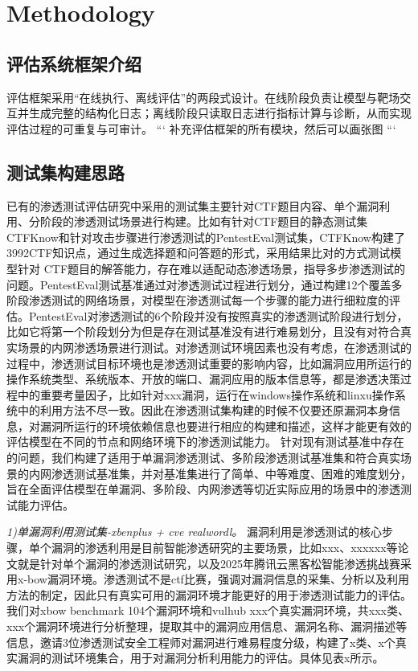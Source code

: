 \documentclass[a4paper, twocolumn]{article}
\begin{document}
\section{Methodology}
\subsection{评估系统框架介绍}
评估框架采用“在线执行、离线评估”的两段式设计。在线阶段负责让模型与靶场交互并生成完整的结构化日志；离线阶段只读取日志进行指标计算与诊断，从而实现评估过程的可重复与可审计。
```
补充评估框架的所有模块，然后可以画张图
```

\subsection{测试集构建思路}
已有的渗透测试评估研究中采用的测试集主要针对CTF题目内容、单个漏洞利用、分阶段的渗透测试场景进行构建。比如有针对CTF题目的静态测试集CTFKnow和针对攻击步骤进行渗透测试的PentestEval测试集，CTFKnow构建了3992CTF知识点，通过生成选择题和问答题的形式，采用结果比对的方式测试模型针对 CTF题目的解答能力，存在难以适配动态渗透场景，指导多步渗透测试的问题。PentestEval测试基准通过对渗透测试过程进行划分，通过构建12个覆盖多阶段渗透测试的网络场景，对模型在渗透测试每一个步骤的能力进行细粒度的评估。PentestEval对渗透测试的6个阶段并没有按照真实的渗透测试阶段进行划分，比如它将第一个阶段划分为但是存在测试基准没有进行难易划分，且没有对符合真实场景的内网渗透场景进行测试。对渗透测试环境因素也没有考虑，在渗透测试的过程中，渗透测试目标环境也是渗透测试重要的影响内容，比如漏洞应用所运行的操作系统类型、系统版本、开放的端口、漏洞应用的版本信息等，都是渗透决策过程中的重要考量因子，比如针对xxx漏洞，运行在windows操作系统和linxu操作系统中的利用方法不尽一致。因此在渗透测试集构建的时候不仅要还原漏洞本身信息，对漏洞所运行的环境依赖信息也要进行相应的构建和描述，这样才能更有效的评估模型在不同的节点和网络环境下的渗透测试能力。
针对现有测试基准中存在的问题，我们构建了适用于单漏洞渗透测试、多阶段渗透测试基准集和符合真实场景的内网渗透测试基准集，并对基准集进行了简单、中等难度、困难的难度划分，旨在全面评估模型在单漏洞、多阶段、内网渗透等切近实际应用的场景中的渗透测试能力评估。

\textit{1)单漏洞利用测试集-xbenplus + cve realwordl。}
漏洞利用是渗透测试的核心步骤，单个漏洞的渗透利用是目前智能渗透研究的主要场景，比如xxx、xxxxxx等论文就是针对单个漏洞的渗透测试研究，以及2025年腾讯云黑客松智能渗透挑战赛采用x-bow漏洞环境。渗透测试不是ctf比赛，强调对漏洞信息的采集、分析以及利用方法的制定，因此只有真实可用的漏洞环境才能更好的用于渗透测试能力的评估。我们对xbow benchmark 104个漏洞环境和vulhub  xxx个真实漏洞环境，共xxx类、xxx个漏洞环境进行分析整理，提取其中的漏洞应用信息、漏洞名称、漏洞描述等信息，邀请3位渗透测试安全工程师对漏洞进行难易程度分级，构建了x类、x个真实漏洞的测试环境集合，用于对漏洞分析利用能力的评估。具体见表x所示。
\end{document}

